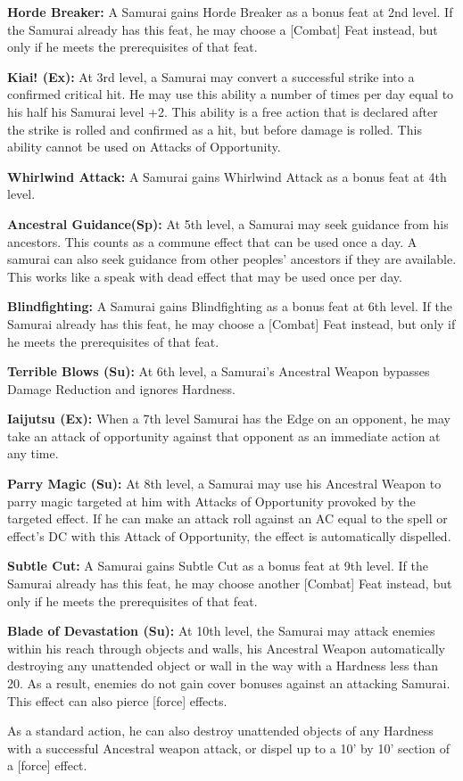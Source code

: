 \documentclass[10pt]{article}
\newcommand{\ability}[2]{\smallskip \noindent \textbf{#1} #2}
\begin{document}
\ability{Horde Breaker:}{A Samurai gains Horde Breaker as a bonus feat at 2nd level. If the Samurai already has this feat, he may choose a [Combat] Feat instead, but only if he meets the prerequisites of that feat.}

\ability{Kiai! (Ex):}{At 3rd level, a Samurai may convert a successful strike into a confirmed critical hit. He may use this ability a number of times per day equal to his half his Samurai level +2. This ability is a free action that is declared after the strike is rolled and confirmed as a hit, but before damage is rolled. This ability cannot be used on Attacks of Opportunity.}

\ability{Whirlwind Attack:}{A Samurai gains Whirlwind Attack as a bonus feat at 4th level.}

\ability{Ancestral Guidance(Sp):}{At 5th level, a Samurai may seek guidance from his ancestors. This counts as a commune effect that can be used once a day. A samurai can also seek guidance from other peoples' ancestors if they are available. This works like a speak with dead effect that may be used once per day.}

\ability{Blindfighting:}{A Samurai gains Blindfighting as a bonus feat at 6th level. If the Samurai already has this feat, he may choose a [Combat] Feat instead, but only if he meets the prerequisites of that feat.}

\ability{Terrible Blows (Su):}{At 6th level, a Samurai's Ancestral Weapon bypasses Damage Reduction and ignores Hardness.}

\ability{Iaijutsu (Ex):}{When a 7th level Samurai has the Edge on an opponent, he may take an attack of opportunity against that opponent as an immediate action at any time.}

\ability{Parry Magic (Su):}{At 8th level, a Samurai may use his Ancestral Weapon to parry magic targeted at him with Attacks of Opportunity provoked by the targeted effect. If he can make an attack roll against an AC equal to the spell or effect's DC with this Attack of Opportunity, the effect is automatically dispelled.}

\ability{Subtle Cut:}{A Samurai gains Subtle Cut as a bonus feat at 9th level. If the Samurai already has this feat, he may choose another [Combat] Feat instead, but only if he meets the prerequisites of that feat.}

\ability{Blade of Devastation (Su):}{At 10th level, the Samurai may attack enemies within his reach through objects and walls, his Ancestral Weapon automatically destroying any unattended object or wall in the way with a Hardness less than 20. As a result, enemies do not gain cover bonuses against an attacking Samurai. This effect can also pierce [force] effects.\smallskip

As a standard action, he can also destroy unattended objects of any Hardness with a successful Ancestral weapon attack, or dispel up to a 10' by 10' section of a [force] effect.}
\end{document}
